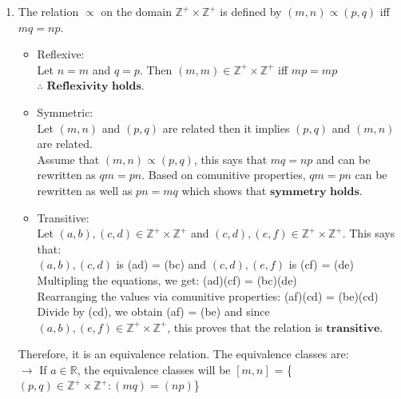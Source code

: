 \documentclass{article}
\newcommand{\R}{\mathbb{R}}
\newcommand{\Z}{\mathbb{Z}}
\begin{document}
\begin{enumerate}
\begin{enumerate}
    \item The relation $\varpropto$ on the domain $\Z^+\times\Z^+$ is defined by $(m,n) \varpropto (p,q)$ iff $mq = np$.
    \begin{itemize}
        \item Reflexive:\\Let $n = m$ and $q = p$. Then $(m,m) \in \Z^+\times\Z^+$ iff $mp = mp$\\$\therefore$ $\textbf{Reflexivity holds.}$\\
        \item Symmetric:\\Let $(m,n)$ and $(p,q)$ are related then it implies $(p,q)$ and $(m,n)$ are related.\\Assume that $(m,n) \varpropto (p,q)$,
        this says that $mq = np$ and can be rewritten as $qm = pn$. Based on comunitive properties, $qm = pn$ can be rewritten as well as $pn = mq$ 
        which shows that $\textbf{symmetry holds}$.\\
        \item Transitive:\\ Let $(a,b), (c,d) \in \Z^+\times\Z^+$ and $(c,d), (e,f) \in \Z^+\times\Z^+$. This says that:\\ $(a,b), (c,d)$ is (ad) = (bc) and $(c,d), (e,f)$ is (cf) = (de)\\
        Multipling the equations, we get: (ad)(cf) = (bc)(de)\\
        Rearranging the values via comunitive properties: (af)(cd) = (be)(cd)\\
        Divide by (cd), we obtain (af) = (be) and since $(a,b), (e,f) \in \Z^+\times\Z^+$, this proves 
        that the relation is $\textbf{transitive}$.
    \end{itemize}
Therefore, it is an equivalence relation. The equivalence classes are:\\
$\rightarrow$ If $a \in \R$, the equivalence classes will be $[m,n]$ = \{$(p,q) \in \Z^+\times\Z^+:(mq)=(np)$\}\\

\end{enumerate}

\end{enumerate}
\end{document}
